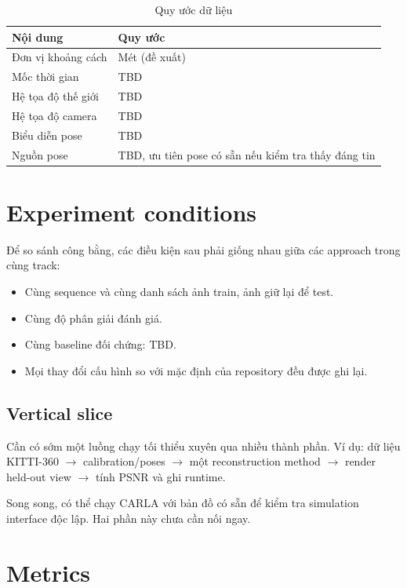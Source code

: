 \begin{table}[H]
  \centering
  \caption{Quy ước dữ liệu}
  \begin{tabularx}{\linewidth}{l X}
    \toprule
    \textbf{Nội dung} & \textbf{Quy ước} \\
    \midrule
    Đơn vị khoảng cách & Mét (đề xuất) \\
    Mốc thời gian & TBD \\
    Hệ tọa độ thế giới & TBD \\
    Hệ tọa độ camera & TBD \\
    Biểu diễn pose & TBD \\
    Nguồn pose & TBD, ưu tiên pose có sẵn nếu kiểm tra thấy đáng tin \\
    \bottomrule
  \end{tabularx}
\end{table}

\section{Experiment conditions}

Để so sánh công bằng, các điều kiện sau phải giống nhau giữa các approach trong cùng track:
\begin{itemize}
  \item Cùng sequence và cùng danh sách ảnh train, ảnh giữ lại để test.
  \item Cùng độ phân giải đánh giá.
  \item Cùng baseline đối chứng: TBD.
  \item Mọi thay đổi cấu hình so với mặc định của repository đều được ghi lại.
\end{itemize}

\subsection{Vertical slice}

Cần có sớm một luồng chạy tối thiểu xuyên qua nhiều thành phần.
Ví dụ: dữ liệu KITTI-360 $\to$ calibration/poses $\to$ một reconstruction method $\to$ render held-out view $\to$ tính PSNR và ghi runtime.

Song song, có thể chạy CARLA với bản đồ có sẵn để kiểm tra simulation interface độc lập. Hai phần này chưa cần nối ngay.

\section{Metrics}


